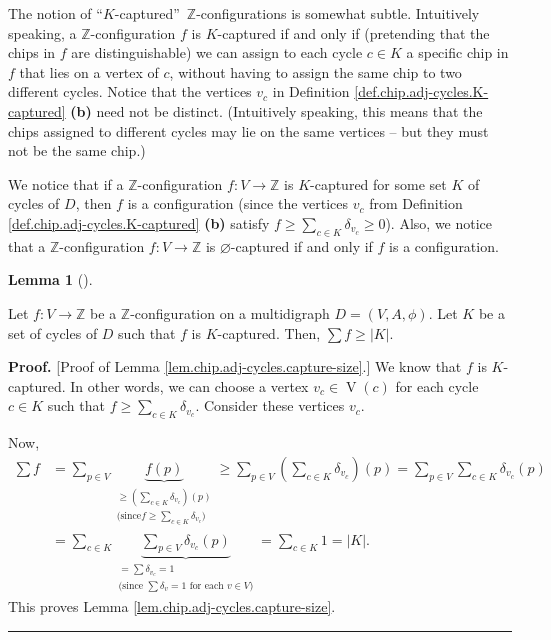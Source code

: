 \documentclass[numbers=enddot,12pt,final,onecolumn,notitlepage]{scrartcl}%
\theoremstyle{definition}
\newtheorem{lem}[theo]{Lemma}
\newenvironment{lemma}[1][]
{\begin{lem}[#1]\begin{leftbar}}
{\end{leftbar}\end{lem}}
\newenvironment{proof}[1][Proof]{\noindent\textbf{#1.} }{\ \rule{0.5em}{0.5em}}
\let\sumnonlimits\sum
\renewcommand{\sum}{\sumnonlimits\limits}
\newcommand{\ZZ}{\mathbb{Z}}
\begin{document}
The notion of \textquotedblleft$K$-captured\textquotedblright\ $\ZZ%
$-configurations is somewhat subtle. Intuitively speaking, a $\mathbb{Z}%
$-configuration $f$ is $K$-captured if and only if (pretending that the chips
in $f$ are distinguishable) we can assign to each cycle $c\in K$ a specific
chip in $f$ that lies on a vertex of $c$, without having to assign the same
chip to two different cycles. Notice that the vertices $v_{c}$ in Definition
\ref{def.chip.adj-cycles.K-captured} \textbf{(b)} need not be distinct.
(Intuitively speaking, this means that the chips assigned to different cycles
may lie on the same vertices -- but they must not be the same chip.)

We notice that if a $\mathbb{Z}$-configuration $f:V\rightarrow\mathbb{Z}$ is
$K$-captured for some set $K$ of cycles of $D$, then $f$ is a configuration
(since the vertices $v_{c}$ from Definition
\ref{def.chip.adj-cycles.K-captured} \textbf{(b)} satisfy $f\geq\sum_{c\in
K}\delta_{v_{c}}\geq0$). Also, we notice that a $\mathbb{Z}$-configuration
$f:V\rightarrow\mathbb{Z}$ is $\varnothing$-captured if and only if $f$ is a configuration.

\begin{lemma}
\label{lem.chip.adj-cycles.capture-size}Let $f:V\rightarrow\mathbb{Z}$ be a
$\ZZ$-configuration on a multidigraph $D=\left(  V,A,\phi\right)  $. Let
$K$ be a set of cycles of $D$ such that $f$ is $K$-captured.
Then, $\sum f\geq\left\vert K\right\vert $.
\end{lemma}

\begin{proof}
[Proof of Lemma \ref{lem.chip.adj-cycles.capture-size}.] We know that $f$ is
$K$-captured. In other words, we can choose a vertex $v_{c}\in
\operatorname*{V}\left(  c\right)  $ for each cycle $c\in K$ such that
$f\geq\sum_{c\in K}\delta_{v_{c}}$. Consider these vertices $v_{c}$.

Now,%
\begin{align*}
\sum f  & =\sum_{p\in V}\underbrace{f\left(  p\right)  }_{\substack{\geq
\left(  \sum_{c\in K}\delta_{v_{c}}\right)  \left(  p\right)  \\\text{(since
}f\geq\sum_{c\in K}\delta_{v_{c}}\text{)}}}\geq\sum_{p\in V}\left(  \sum_{c\in
K}\delta_{v_{c}}\right)  \left(  p\right)  =\sum_{p\in V}\sum_{c\in K}%
\delta_{v_{c}}\left(  p\right)  \\
& =\sum_{c\in K}\underbrace{\sum_{p\in V}\delta_{v_{c}}\left(  p\right)
}_{\substack{=\sum\delta_{v_{c}}=1\\\text{(since }\sum\delta_{v}=1\text{ for
each }v\in V\text{)}}}=\sum_{c\in K}1=\left\vert K\right\vert .
\end{align*}
This proves Lemma \ref{lem.chip.adj-cycles.capture-size}.
\end{proof}
\end{document}

